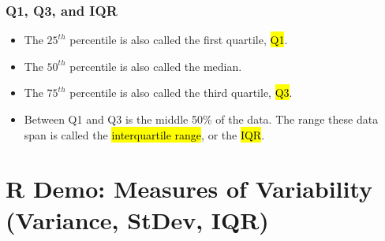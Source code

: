 \documentclass[slidestop,compress,mathserif]{beamer}
\begin{document}
\begin{frame}[fragile]
\frametitle{Q1, Q3, and IQR}

\begin{itemize}

\item The $25^{th}$ percentile is also called the first quartile, \hl{Q1}.

\item The $50^{th}$ percentile is also called the median.

\item The $75^{th}$ percentile is also called the third quartile, \hl{Q3}.

\item Between Q1 and Q3 is the middle 50\% of the data. The range these data span is called the \hl{interquartile range}, or the \hl{IQR}.
\formula{\[ IQR = Q3 - Q1 \]}
\end{itemize}

\end{frame}

\section{R Demo: Measures of Variability (Variance, StDev, IQR)}



\end{document}
